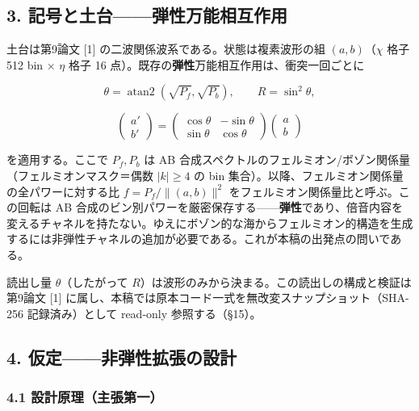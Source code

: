 \documentclass[
  a4paper,
]{ltjsarticle}
\begin{document}
\subsection{3.
記号と土台------弾性万能相互作用}\label{ux8a18ux53f7ux3068ux571fux53f0ux5f3eux6027ux4e07ux80fdux76f8ux4e92ux4f5cux7528}

土台は第9論文 {[}1{]} の二波関係波系である。状態は複素波形の組
\((a,b)\)（\(\chi\) 格子 512 bin × \(\eta\) 格子 16
点）。既存の\textbf{弾性}万能相互作用は、衝突一回ごとに

\[\theta = \operatorname{atan2}(\sqrt{P_f}, \sqrt{P_b}), \qquad R = \sin^2\theta,\]

\[\begin{pmatrix} a' \\ b' \end{pmatrix} = \begin{pmatrix} \cos\theta & -\sin\theta \\ \sin\theta & \cos\theta \end{pmatrix}\begin{pmatrix} a \\ b \end{pmatrix}\]

を適用する。ここで \(P_f, P_b\) は AB
合成スペクトルのフェルミオン/ボゾン関係量（フェルミオンマスク＝偶数
\(|k|\ge 4\) の bin 集合）。以降、フェルミオン関係量の全パワーに対する比
\(f = P_f/\lVert(a,b)\rVert^2\) をフェルミオン関係量比と呼ぶ。この回転は
AB
合成のビン別パワーを厳密保存する------\textbf{弾性}であり、倍音内容を変えるチャネルを持たない。ゆえにボゾン的な海からフェルミオン的構造を生成するには非弾性チャネルの追加が必要である。これが本稿の出発点の問いである。

読出し量 \(\theta\)（したがって
\(R\)）は波形のみから決まる。この読出しの構成と検証は第9論文 {[}1{]}
に属し、本稿では原本コード一式を無改変スナップショット（SHA-256
記録済み）として read-only 参照する（§15）。

\subsection{4.
仮定------非弾性拡張の設計}\label{ux4eeeux5b9aux975eux5f3eux6027ux62e1ux5f35ux306eux8a2dux8a08}

\subsubsection{4.1
設計原理（主張第一）}\label{ux8a2dux8a08ux539fux7406ux4e3bux5f35ux7b2cux4e00}
\end{document}

